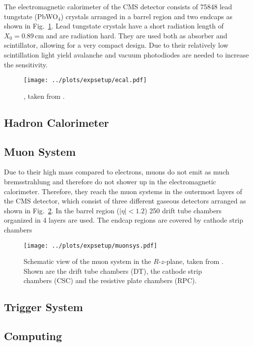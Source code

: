 \noindent The electromagnetic calorimeter of the CMS detector consists of 75848 lead tungstate (PbWO$_4$) crystals arranged in a barrel region and two endcaps as shown in Fig.~\ref{fig:expsetup:ecal}. Lead tungstate crystals have a short radiation length of $X_0=0.89$\,cm and are radiation hard. They are used both as absorber and scintillator, allowing for a very compact design. Due to their relatively low scintillation light yield avalanche and vacuum photodiodes are needed to increase the sensitivity. 
\begin{figure}
    \centering
    \texttt{[image: ../plots/expsetup/ecal.pdf]}
    \caption[]{, taken from \cite{CMS_design}.}
    \label{fig:expsetup:ecal}
\end{figure}
\subsection*{Hadron Calorimeter}
\subsection*{Muon System}
Due to their high mass compared to electrons, muons do not emit as much bremsstrahlung and therefore do not shower up in the electromagnetic calorimeter. Therefore, they reach the muon systems in the outermost layers of the CMS detector, which consist of three different gaseous detectors arranged as shown in Fig.~\ref{fig:expsetup:muonsys}. In the barrel region ($|\eta|<1.2$) 250 drift tube chambers organized in 4 layers are used. The endcap regions are covered by cathode strip chambers
\begin{figure}
    \centering
    \texttt{[image: ../plots/expsetup/muonsys.pdf]}
    \caption[Schematic view of the muon system in the $R$-$z$-plane]{Schematic view of the muon system in the $R$-$z$-plane, taken from \cite{CMS_design}. Shown are the drift tube chambers (DT), the cathode strip chambers (CSC) and the resistive plate chambers (RPC).}
    \label{fig:expsetup:muonsys}
\end{figure}
\subsection*{Trigger System}
\subsection*{Computing}
